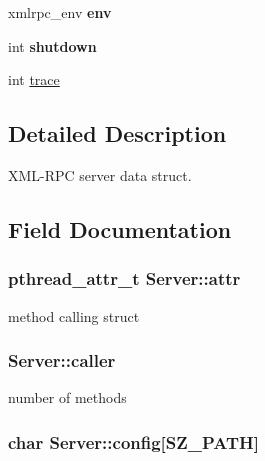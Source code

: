 \begin{CompactItemize}
\item 
\hypertarget{structServer_b50cdb19365000aa482374876aa55fec}{
xmlrpc\_\-env \textbf{env}}
\label{structServer_b50cdb19365000aa482374876aa55fec}

\item 
\hypertarget{structServer_8368636224386de225c659da159155a2}{
int \textbf{shutdown}}
\label{structServer_8368636224386de225c659da159155a2}

\item 
int \hyperlink{structServer_16b8af9cb469718b3fdfd50fbe9fbc3a}{trace}
\end{CompactItemize}


\subsection{Detailed Description}
XML-RPC server data struct. 

\subsection{Field Documentation}
\hypertarget{structServer_922879601b599ff38a9638a72da810fa}{
\subsubsection[{attr}]{\setlength{\rightskip}{0pt plus 5cm}pthread\_\-attr\_\-t {\bf Server::attr}}}
\label{structServer_922879601b599ff38a9638a72da810fa}


method calling struct \hypertarget{structServer_bac1edd9485d6c86e5d6273c9e7efe79}{
\subsubsection[{caller}]{ {\bf Server::caller}}}
\label{structServer_bac1edd9485d6c86e5d6273c9e7efe79}


number of methods \hypertarget{structServer_25c424b3c00a12aefd80dd82dafa1f9f}{
\subsubsection[{config}]{\setlength{\rightskip}{0pt plus 5cm}char {\bf Server::config}\mbox{[}SZ\_\-PATH\mbox{]}}}
\label{structServer_25c424b3c00a12aefd80dd82dafa1f9f}


